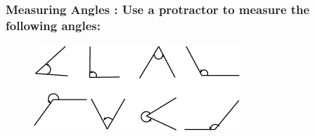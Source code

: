             \subsubsection{  Measuring Angles : Use a protractor to measure the following angles:}
            \nopagebreak
          \label{m39370*id314481}
    \setcounter{subfigure}{0}
	\begin{figure}[H] %
    \begin{center}
    \label{m39370*id314484!!!underscore!!!media}\label{m39370*id314484!!!underscore!!!printimage}\includegraphics{col11306.imgs/m39370_MG10C13_005.png} %
      \vspace{2pt}
    \vspace{.1in}
    \end{center}
 \end{figure}       
          \par 
      \label{m39370*uid17}
